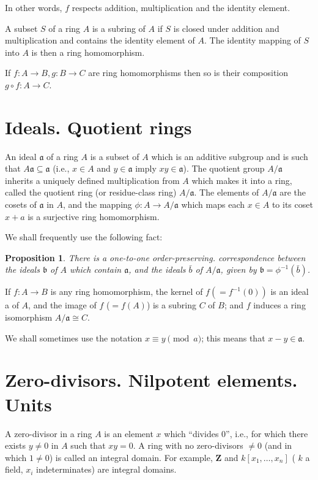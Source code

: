 \documentclass[class=book, crop=false]{standalone}
\newtheorem{proposition}[theorem]{Proposition}
\theoremstyle{definition}
\theoremstyle{remark}
\begin{document}
In other words, $f$ respects addition, multiplication and the identity element.

A subset $S$ of a ring $A$ is a subring of $A$ if $S$ is closed under addition
and multiplication and contains the identity element of $A$. The identity
mapping of $S$ into $A$ is then a ring homomorphism.

If $f: A\to B, g: B \to C$ are ring homomorphisms then so is their composition
$g \circ f: A \to C$.

\section{Ideals. Quotient rings}
An ideal $\mathfrak{a}$ of a ring $A$ is a subset of $A$ which is an additive
subgroup and is such that $A \mathfrak{a} \subseteq \mathfrak{a}$ (i.e.,
$x \in A$ and $y \in \mathfrak{a}$ imply $x y \in \mathfrak{a}$). The quotient
group $A / \mathfrak{a}$ inherits a uniquely defined multiplication from $A$
which makes it into a ring, called the quotient ring (or residue-class ring)
$A / \mathfrak{a}$. The elements of $A / \mathfrak{a}$ are the cosets of
$\mathfrak{a}$ in $A$, and the mapping $\phi: A \to A / \mathfrak{a}$ which maps
each $x \in A$ to its coset $x+a$ is a surjective ring homomorphism.

We shall frequently use the following fact:
\begin{proposition}
  There is a one-to-one order-preserving. correspondence between the ideals
  $\mathfrak{b}$ of $A$ which contain $\mathfrak{a}$, and the ideals $\bar{b}$
  of $A / \mathfrak{a}$, given by $\mathfrak{b}=\phi^{-1}(\bar{b})$.
\end{proposition}

If $f: A \to B$ is any ring homomorphism, the kernel of
$f\left(=f^{-1}(0)\right)$ is an ideal a of $A$, and the image of $f$ ($=f(A)$)
is a subring $C$ of $B$; and $f$ induces a ring isomorphism
$A / \mathfrak{a} \cong C$.

We shall sometimes use the notation $x \equiv y\pmod{a}$; this means that
$x-y \in \mathfrak{a}$.

\section{Zero-divisors. Nilpotent elements. Units}
A zero-divisor in a ring $A$ is an element $x$ which ``divides 0'', i.e., for
which there exists $y \neq 0$ in $A$ such that $x y=0$. A ring with no
zero-divisors $\neq 0$ (and in which $1 \neq 0$) is called an integral domain.
For example, $\mathbf{Z}$ and $k\left[x_{1}, \ldots, x_{n}\right]$ ( $k$ a
field, $x_{i}$ indeterminates) are integral domains.
\end{document}
